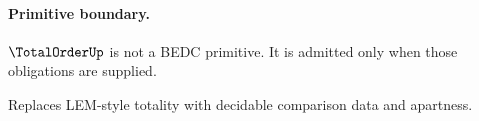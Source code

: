\paragraph{Primitive boundary.}
\(\TotalOrderUp\) is not a BEDC primitive. It is admitted only when those obligations are supplied.

\begin{remark}
\label{rem:totalorder-zero-axiom-note}
Replaces LEM-style totality with decidable comparison data and apartness.
\end{remark}
